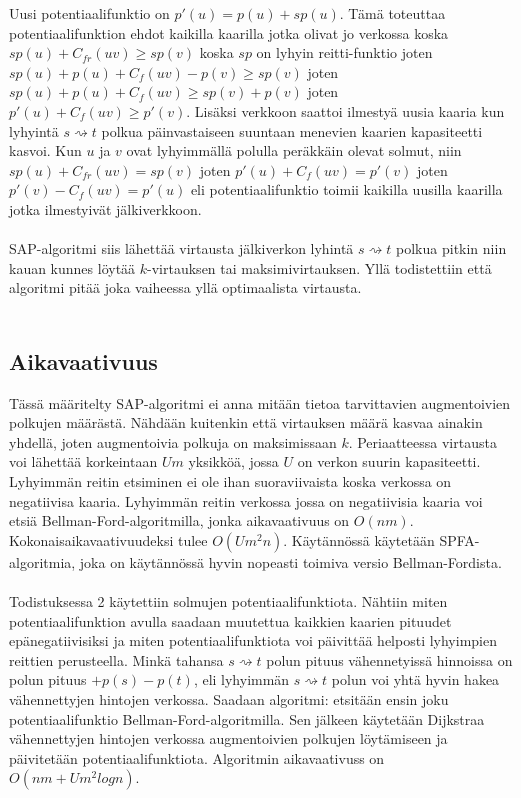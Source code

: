\documentclass[a4paper, 11pt]{article}
\begin{document}
Uusi potentiaalifunktio on $p'(u) = p(u) + sp(u)$. Tämä toteuttaa potentiaalifunktion
ehdot kaikilla kaarilla jotka olivat jo verkossa koska $sp(u) + C_{fr}(uv) \ge sp(v)$
koska $sp$ on lyhyin reitti-funktio joten $sp(u) + p(u) + C_f(uv) - p(v) \ge sp(v)$
joten $sp(u) + p(u) + C_f(uv) \ge sp(v) + p(v)$ joten $p'(u) + C_f(uv) \ge p'(v)$.
Lisäksi verkkoon saattoi ilmestyä uusia kaaria kun lyhyintä $s \rightsquigarrow t$ polkua
päinvastaiseen suuntaan menevien kaarien kapasiteetti kasvoi. Kun $u$ ja $v$ ovat
lyhyimmällä polulla peräkkäin olevat solmut, niin $sp(u) + C_{fr}(uv) = sp(v)$ joten
$p'(u) + C_f(uv) = p'(v)$ joten $p'(v) - C_f(uv) = p'(u)$ eli potentiaalifunktio
toimii kaikilla uusilla kaarilla jotka ilmestyivät jälkiverkkoon.\\\\
SAP-algoritmi siis lähettää virtausta jälkiverkon lyhintä $s \rightsquigarrow t$ polkua
pitkin niin kauan
kunnes löytää $k$-virtauksen tai maksimivirtauksen. Yllä todistettiin että algoritmi
pitää joka vaiheessa yllä optimaalista virtausta.\\\\
\subsection*{Aikavaativuus}
Tässä määritelty SAP-algoritmi ei anna mitään tietoa tarvittavien augmentoivien
polkujen määrästä. Nähdään kuitenkin että virtauksen määrä kasvaa ainakin yhdellä, joten
augmentoivia polkuja on maksimissaan $k$. Periaatteessa virtausta voi lähettää 
korkeintaan $Um$ yksikköä, jossa $U$ on verkon suurin kapasiteetti. Lyhyimmän reitin
etsiminen ei ole ihan suoraviivaista koska verkossa on negatiivisa kaaria. Lyhyimmän reitin
verkossa jossa on negatiivisia kaaria
voi etsiä Bellman-Ford-algoritmilla, jonka aikavaativuus on $O(nm)$.
Kokonaisaikavaativuudeksi tulee $O(Um^2n)$. Käytännössä käytetään
SPFA-algoritmia, joka on käytännössä hyvin nopeasti toimiva versio Bellman-Fordista.
\\\\
\noindent
Todistuksessa 2 käytettiin solmujen potentiaalifunktiota. Nähtiin miten potentiaalifunktion
avulla saadaan muutettua kaikkien kaarien pituudet epänegatiivisiksi ja miten potentiaalifunktiota
voi päivittää helposti lyhyimpien reittien perusteella. Minkä tahansa $s \rightsquigarrow t$
polun pituus vähennetyissä hinnoissa on polun pituus $+ p(s) - p(t)$, eli lyhyimmän 
$s \rightsquigarrow t$ polun voi yhtä hyvin hakea vähennettyjen hintojen verkossa.
Saadaan algoritmi: etsitään ensin joku potentiaalifunktio Bellman-Ford-algoritmilla.
Sen jälkeen käytetään Dijkstraa vähennettyjen hintojen verkossa augmentoivien polkujen
löytämiseen ja päivitetään potentiaalifunktiota. Algoritmin aikavaativuss on $O(nm + Um^2 log n)$.
\end{document}
